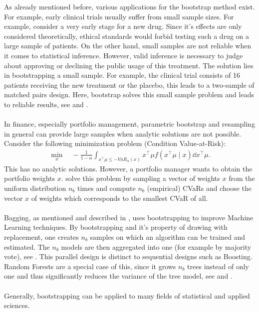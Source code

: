 As already mentioned before, various applications for the bootstrap method exist. For example, early clinical trials usually suffer from small sample sizes. For example, consider a very early stage for a new drug. Since it's effects are only considered theoretically, ethical standards would forbid testing such a drug on a large sample of patients. On the other hand, small samples are not reliable when it comes to statistical inference. However, valid inference is necessary to judge about approving or declining the public usage of this treatment. The solution lies in bootstrapping a small sample. For example, the clinical trial consists of 16 patients receiving the new treatment or the placebo, this leads to a two-sample of matched pairs design. Here, bootstrap solves this small sample problem and leads to reliable results, see \citet{boot4} and \citet{boot2}.\\
\\
\noindent In finance, especially portfolio management, parametric bootstrap and resampling in general can provide large samples when analytic solutions are not possible. Consider the following minimization problem (Condition Value-at-Risk):
\begin{align}
	\min_{x} \quad - \frac{1}{1 - \alpha}\int_{x^{\intercal}\mu \leq -VaR_{\alpha}(x)} x^{\intercal}\mu f\left(x^{\intercal}\mu \mid x\right)\dd x^{\intercal}\mu.
\end{align}
This has no analytic solutions. However, a portfolio manager wants to obtain the portfolio weights $x$. \citet{erin} solve this problem by sampling a vector of weights $x$ from the uniform distribution $n_{b}$ times and compute $n_{b}$ (empirical) CVaRs and choose the vector $x$ of weights which corresponds to the smallest CVaR of all.\\
\\
\noindent Bagging, as mentioned and described in \citet{stat1}, uses bootstrapping to improve Machine Learning techniques. By bootstrapping and it's property of drawing with replacement, one creates $n_b$ samples on which an algorithm can be trained and estimated. The $n_b$ models are then aggregated into one (for example by majority vote), see \citet{rf2}. This parallel design is distinct to sequential designs such as Boosting. Random Forests are a special case of this, since it grows $n_b$ trees instead of only one and thus significantly reduces the variance of the tree model, see \citet{rf1} and \citet{rf3}.\\
\\
\noindent Generally, bootstrapping can be applied to many fields of statistical and applied sciences. 